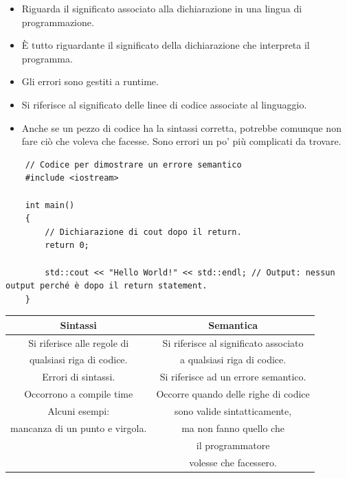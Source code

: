 \begin{itemize}
	\item \textsf{\small Riguarda il significato associato alla dichiarazione in una lingua di programmazione.}
	\item \textsf{\small È tutto riguardante il significato della dichiarazione che interpreta il programma.}
	\item \textsf{\small Gli errori sono gestiti a runtime.}
	\item \textsf{\small Si riferisce al significato delle linee di codice associate al linguaggio.}
	\item \textsf{\small Anche se un pezzo di codice ha la sintassi corretta, potrebbe comunque non fare ciò che voleva che facesse. Sono errori un po' più complicati da trovare.}
\end{itemize}

\begin{lstlisting}
	// Codice per dimostrare un errore semantico
	#include <iostream>
	
	int main()
	{
		// Dichiarazione di cout dopo il return.
		return 0;
		
		std::cout << "Hello World!" << std::endl; // Output: nessun output perché è dopo il return statement.
	}
\end{lstlisting}

\begin{tabular}{|c|c|}
	\hline
	\textbf{Sintassi} & \textbf{Semantica} \\
	\hline
	\textsf{\small Si riferisce alle regole di } & \textsf{\small Si riferisce al significato associato } \\
	\textsf{\small qualsiasi riga di codice.} & \textsf{\small a qualsiasi riga di codice.} \\
	\hline
	\textsf{\small Errori di sintassi. } & \textsf{\small Si riferisce ad un errore semantico. } \\
	\textsf{\small Occorrono a compile time } & \textsf{\small Occorre quando delle righe di codice } \\
	\textsf{\small Alcuni esempi: } & \textsf{\small sono valide sintatticamente,} \\
	\textsf{\small mancanza di un punto e virgola.} & \textsf{\small ma non fanno quello che } \\
	\textsf{\small } & \textsf{\small il programmatore } \\
	\textsf{\small } & \textsf{\small volesse che facessero.} \\
	\hline
\end{tabular}


